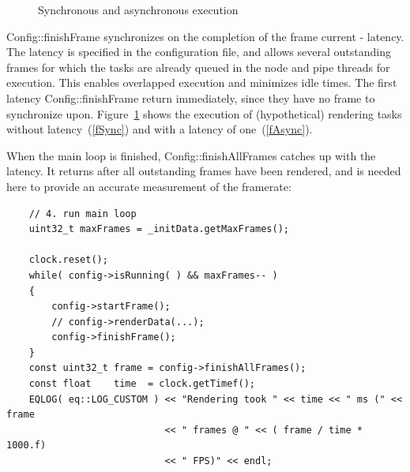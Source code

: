 \documentclass[10pt,a4]{scrartcl}
\begin{document}
\begin{figure}
  \hfil
  {\caption{\small\label{fSyncAsync}Synchronous and asynchronous execution}}
\end{figure}
\textsf{Config::finishFrame} synchronizes on the completion of the frame
\textsf{current - latency}. The latency is specified in the
configuration file, and allows several outstanding frames for which the
tasks are already queued in the node and pipe threads for
execution. This enables overlapped execution and minimizes idle
times. The first \textsf{latency Config::finishFrame} return
immediately, since they have no frame to synchronize
upon. Figure~\ref{fSyncAsync} shows the execution of (hypothetical)
rendering tasks without latency~(\ref{fSync}) and with a latency of
one~(\ref{fAsync}).

When the main loop is finished, \textsf{Config::finishAllFrames} catches
up with the latency. It returns after all outstanding frames have been
rendered, and is needed here to provide an accurate measurement of the
framerate:

{\footnotesize\begin{lstlisting}
    // 4. run main loop
    uint32_t maxFrames = _initData.getMaxFrames();
    
    clock.reset();
    while( config->isRunning( ) && maxFrames-- )
    {
        config->startFrame();
        // config->renderData(...);
        config->finishFrame();
    }
    const uint32_t frame = config->finishAllFrames();
    const float    time  = clock.getTimef();
    EQLOG( eq::LOG_CUSTOM ) << "Rendering took " << time << " ms (" << frame
                            << " frames @ " << ( frame / time * 1000.f)
                            << " FPS)" << endl;
\end{lstlisting}}%
\end{document}
